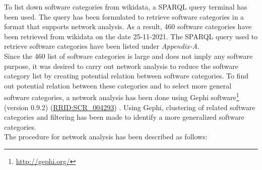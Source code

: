 To list down software categories from wikidata, a \ac{SPARQL} query terminal has been used. The query has been formulated to retrieve software categories in a format that supports network analysis. As a result, 460 software categories have been retrieved from wikidata on the date 25-11-2021. The \ac{SPARQL} query used to retrieve software categories have been listed under \emph{Appendix-A}.\\

Since the 460 list of software categories is large and does not imply any software purpose, it was desired to carry out network analysis to reduce the software category list by creating potential relation between software categories. To find out potential relation between these categories and to select more general software categories, a network analysis has been done using Gephi software\footnote{\url{http://gephi.org/}} (version 0.9.2) (\href{https://scicrunch.org/resolver/SCR_004293}{RRID:SCR\_004293}) . Using Gephi, clustering of related software categories and filtering has been made to identify a more generalized software categories. \\

\noindent The procedure for network analysis has been described as follows:


